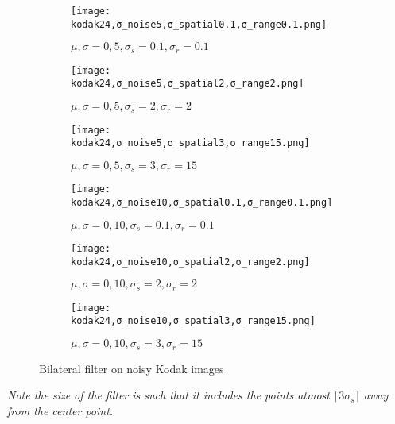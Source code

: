 \documentclass[a4paper, landscape]{article}
\begin{document}
\begin{figure}
    \centering
    \begin{subfigure}{0.33\linewidth}
        \centering
        \texttt{[image: kodak24,σ\_noise5,σ\_spatial0.1,σ\_range0.1.png]}
        \caption{$\mu, \sigma = 0, 5, \sigma_s=0.1, \sigma_r=0.1$}
    \end{subfigure}
    \begin{subfigure}{0.33\linewidth}
        \centering
        \texttt{[image: kodak24,σ\_noise5,σ\_spatial2,σ\_range2.png]}
        \caption{$\mu, \sigma = 0, 5, \sigma_s=2, \sigma_r=2$}
    \end{subfigure}
    \begin{subfigure}{0.33\linewidth}
        \centering
        \texttt{[image: kodak24,σ\_noise5,σ\_spatial3,σ\_range15.png]}
        \caption{$\mu, \sigma = 0, 5, \sigma_s=3, \sigma_r=15$}
    \end{subfigure}
    \begin{subfigure}{0.33\linewidth}
        \centering
        \texttt{[image: kodak24,σ\_noise10,σ\_spatial0.1,σ\_range0.1.png]}
        \caption{$\mu, \sigma = 0, 10, \sigma_s=0.1, \sigma_r=0.1$}
    \end{subfigure}
    \begin{subfigure}{0.33\linewidth}
        \centering
        \texttt{[image: kodak24,σ\_noise10,σ\_spatial2,σ\_range2.png]}
        \caption{$\mu, \sigma = 0, 10, \sigma_s=2, \sigma_r=2$}
    \end{subfigure}
    \begin{subfigure}{0.33\linewidth}
        \centering
        \texttt{[image: kodak24,σ\_noise10,σ\_spatial3,σ\_range15.png]}
        \caption{$\mu, \sigma = 0, 10, \sigma_s=3, \sigma_r=15$}
    \end{subfigure}
    \caption{Bilateral filter on noisy Kodak images}
    \label{fig:kn}
\end{figure}

{\it Note the size of the filter is such that it includes the points atmost ${\lceil3\sigma_s\rceil}$ away from the center point.
}
\end{document}
